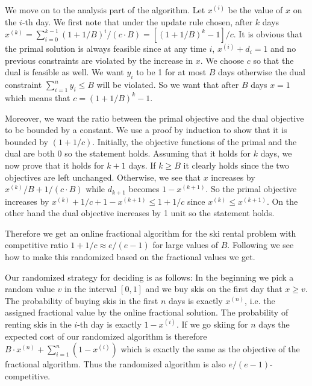 We move on to the analysis part of the algorithm. Let $x^{(i)}$ be the value of $x$ on the $i$-th day. We first note that under the update rule chosen, after $k$ days $x^{(k)} =  \sum_{i=0}^{k-1} (1+1/B)^i / (c\cdot B) = [(1+1/B)^k-1]/c$. It is obvious that the primal solution is always feasible since at any time $i$, $x^{(i)}+d_i=1$ and no previous constraints are violated by the increase in $x$. We choose $c$ so that the dual is feasible as well. We want $y_i$ to be 1 for at most $B$ days otherwise the dual constraint  $\sum^n_{i=1} y_i \le B$ will be violated. So we want that after $B$ days $x = 1$ which means that $c = (1+1/B)^k-1$.

Moreover, we want the ratio between the primal objective and the dual objective to be bounded by a constant.
We use a proof by induction to show that it is bounded by $(1+1/c)$.
Initially, the objective functions of the primal and the dual are both 0 so the statement holds.
Assuming that it holds for $k$ days, we now prove that it holds for $k+1$ days.
If $k\ge B$ it clearly holds since the two objectives are left unchanged.
Otherwise, we see that $x$ increases by $x^{(k)} / B + 1/(c \cdot B)$ while $d_{k+1}$ becomes $1 - x^{(k+1)}$.
So the primal objective increases by $x^{(k)} + 1/c + 1 - x^{(k+1)} \le 1 + 1/c$ since $x^{(k)} \le x^{(k+1)}$.
On the other hand the dual objective increases by 1 unit so the statement holds.

Therefore we get an online fractional algorithm for the ski rental problem with competitive ratio $1+1/c \approx e/(e-1)$ for large values of $B$.
Following we see how to make this randomized based on the fractional values we get.

Our randomized strategy for deciding is as follows: In the beginning we pick a random value $v$ in the interval $[0,1]$ and we buy skis on the first day that $x \ge v$.
The probability of buying skis in the first $n$ days is exactly $x^{(n)}$, i.e. the assigned fractional value by the online fractional solution. The probability of renting skis in the $i$-th day is exactly $1-x^{(i)}$.
If we go skiing for $n$ days the expected cost of our randomized algorithm is therefore $B \cdot  x^{(n)} + \sum_{i=1}^n(1-x^{(i)})$ which is exactly the same as the objective of the fractional algorithm.
Thus the randomized algorithm is also $e/(e-1)$-competitive.

